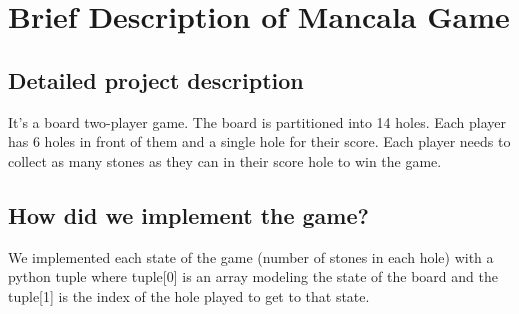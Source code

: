 \chapter{Brief Description of Mancala Game}
\section{Detailed project description}
It’s a board two-player game. The board is partitioned into 14 holes. Each player has 6 holes in front of
them and a single hole for their score. Each player needs to collect as many stones as they
can in their score hole to win the game.

\section{How did we implement the game?}
We implemented each state of the game (number of stones in each hole) with a python tuple where tuple[0] is 
an array modeling the state of the board and the tuple[1] is the index of the hole played to get to
that state. 
\vskip 0.25in

